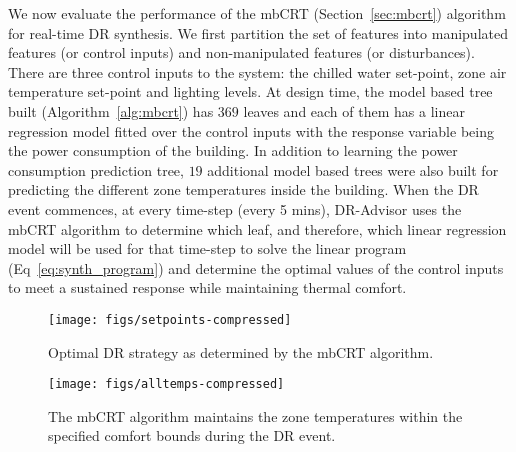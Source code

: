 \documentclass{sig-alternate-ipsn13}
\theoremstyle{definition}
\begin{document}
We now evaluate the performance of the mbCRT (Section~\ref{sec:mbcrt}) algorithm for real-time DR synthesis. 
We first partition the set of features into manipulated features (or control inputs) and non-manipulated features (or disturbances). 
There are three control inputs to the system: the chilled water set-point, zone air temperature set-point and lighting levels.
At design time, the model based tree built (Algorithm~\ref{alg:mbcrt}) has $369$ leaves and each of them has a linear regression model fitted over the control inputs with  the response variable being the power consumption of the building.
In addition to learning the power consumption prediction tree, $19$ additional model based trees were also built for predicting the different zone temperatures inside the building.
When the DR event commences, at every time-step (every 5 mins), DR-Advisor uses the mbCRT algorithm to determine which leaf, and therefore, which linear regression model will be used for that time-step to solve the linear program (Eq~\ref{eq:synth_program}) and determine the optimal values of the control inputs to meet a sustained response while maintaining thermal comfort.
 \begin{figure}
\centering
\texttt{[image: figs/setpoints-compressed]}
\caption{Optimal DR strategy as determined by the mbCRT algorithm.}
\label{fig:set-points}
\vspace{-10pt}
\end{figure}

\begin{figure}
\centering
\texttt{[image: figs/alltemps-compressed]}
\caption{The mbCRT algorithm maintains the zone temperatures within the specified comfort bounds during the DR event.}
\label{fig:alltemps}
\vspace{-10pt}
\end{figure}
\end{document}
